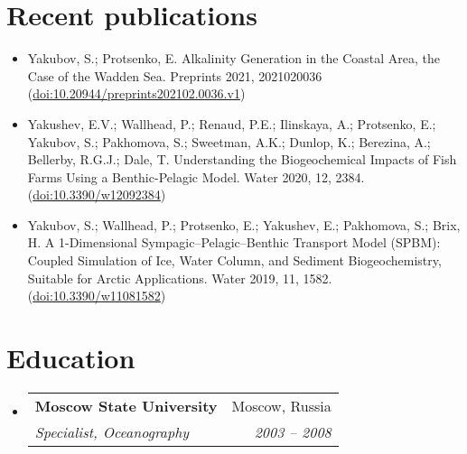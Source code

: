 \documentclass[letterpaper,11pt]{article}
\makeatletter
\newcommand{\resumePubItem}[2]{
  \item\small{
    \textbf{#1}{ #2 \vspace{-2pt}}
  }
}
\newcommand{\resumeSubheading}[4]{
  \vspace{-1pt}\item
    \begin{tabular*}{0.97\textwidth}[t]{l@{\extracolsep{\fill}}r}
      \textbf{#1} & #2 \\
      \textit{\small#3} & \textit{\small #4} \\
    \end{tabular*}\vspace{-5pt}
}
\newcommand{\resumeSubHeadingListStart}{\begin{itemize}[leftmargin=*]}
\newcommand{\resumeSubHeadingListEnd}{\end{itemize}}
\makeatother
\begin{document}
\section{Recent publications}
  \resumeSubHeadingListStart
    \resumePubItem{}
      {Yakubov, S.; Protsenko, E. Alkalinity Generation in the Coastal Area, the Case of the Wadden Sea. Preprints 2021, 2021020036 (\href{https://doi.org/10.20944/preprints202102.0036.v1}{doi:10.20944/preprints202102.0036.v1})}
    \resumePubItem{}
      {Yakushev, E.V.; Wallhead, P.; Renaud, P.E.; Ilinskaya, A.; Protsenko, E.; Yakubov, S.; Pakhomova, S.; Sweetman, A.K.; Dunlop, K.; Berezina, A.; Bellerby, R.G.J.; Dale, T. Understanding the Biogeochemical Impacts of Fish Farms Using a Benthic-Pelagic Model. Water 2020, 12, 2384. (\href{https://doi.org/10.3390/w12092384}{doi:10.3390/w12092384})}
    \resumePubItem{}
      {Yakubov, S.; Wallhead, P.; Protsenko, E.; Yakushev, E.; Pakhomova, S.; Brix, H. A 1-Dimensional Sympagic–Pelagic–Benthic Transport Model (SPBM): Coupled Simulation of Ice, Water Column, and Sediment Biogeochemistry, Suitable for Arctic Applications. Water 2019, 11, 1582. (\href{https://doi.org/10.3390/w11081582}{doi:10.3390/w11081582})}
  \resumeSubHeadingListEnd


\section{Education}
  \resumeSubHeadingListStart
    \resumeSubheading
      {Moscow State University}{Moscow, Russia}
      {Specialist, Oceanography}{2003 -- 2008}
  \resumeSubHeadingListEnd

%


\end{document}
